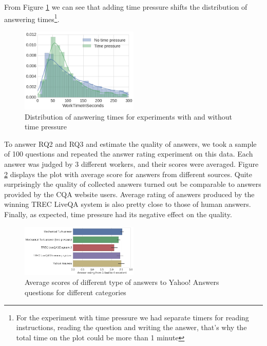 \documentclass[11pt,letterpaper]{article}
\begin{document}
From Figure \ref{fig:answering_time_distribution} we can see that adding time pressure shifts the distribution of answering times\footnote{For the experiment with time pressure we had separate timers for reading instructions, reading the question and writing the answer, that's why the total time on the plot could be more than 1 minute}.

\begin{figure}[h]
	\centering
	\includegraphics[width=0.5\textwidth]{img/answering_time_distribution}
	\caption{Distribution of answering times for experiments with and without time pressure}
	\label{fig:answering_time_distribution}
\end{figure}

To answer RQ2 and RQ3 and estimate the quality of answers, we took a sample of 100 questions and repeated the answer rating experiment on this data.
Each answer was judged by 3 different workers, and their scores were averaged.
Figure \ref{fig:average_score} displays the plot with average score for answers from different sources.
Quite surprisingly the quality of collected answers turned out be comparable to answers provided by the CQA website users.
Average rating of answers produced by the winning TREC LiveQA system is also pretty close to those of human answers.
Finally, as expected, time pressure had its negative effect on the quality.

\begin{figure}[h]
	\centering
	\includegraphics[width=0.5\textwidth]{img/average_score}
	\caption{Average scores of different type of answers to Yahoo! Answers questions for different categories}
	\label{fig:average_score}
\end{figure}
\end{document}
